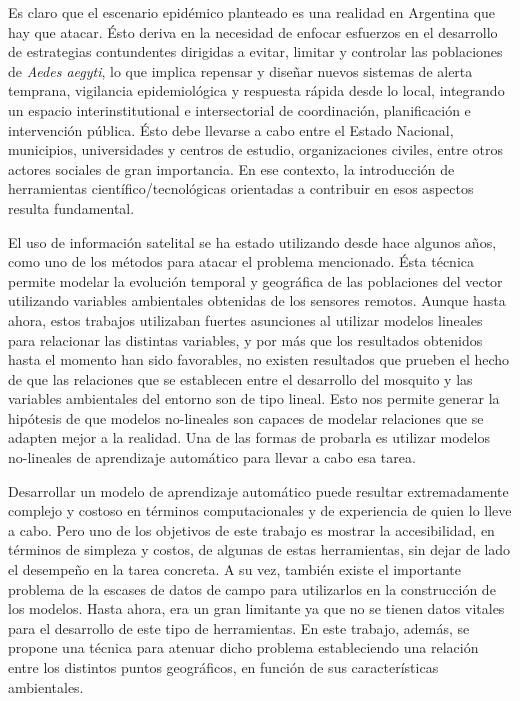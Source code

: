   \par Es claro que el escenario epidémico planteado es una realidad en Argentina
    que hay que atacar. Ésto deriva en la necesidad de enfocar esfuerzos en el
    desarrollo de estrategias contundentes dirigidas a evitar, limitar y controlar
    las poblaciones de \textit{Aedes aegyti}, lo que implica repensar y diseñar
    nuevos sistemas de alerta temprana, vigilancia epidemiológica y respuesta
    rápida desde lo local, integrando un espacio interinstitutional e
    intersectorial de coordinación, planificación e intervención pública. Ésto debe
    llevarse a cabo entre el Estado Nacional, municipios, universidades y centros
    de estudio, organizaciones civiles, entre otros actores sociales de gran importancia.
    En ese contexto, la introducción de herramientas científico/tecnológicas orientadas
    a contribuir en esos aspectos resulta fundamental.

  \par El uso de información satelital se ha estado utilizando desde hace
    algunos años, como uno de los métodos para atacar el problema mencionado.
    Ésta técnica permite modelar la evolución temporal y geográfica de las
    poblaciones del vector utilizando variables ambientales obtenidas de los
    sensores remotos. Aunque hasta ahora, estos trabajos utilizaban fuertes asunciones
    al utilizar modelos lineales para relacionar las distintas variables, y por más
    que los resultados obtenidos hasta el momento han sido
    favorables, no existen resultados que prueben el hecho de que las
    relaciones que se establecen entre el desarrollo
    del mosquito y las variables ambientales del entorno son de tipo lineal.
    Esto nos permite generar la hipótesis de que modelos no-lineales son
    capaces de modelar relaciones que se adapten mejor a la realidad.
    Una de las formas de probarla es utilizar modelos no-lineales de
    aprendizaje automático para llevar a cabo esa tarea.


  \par Desarrollar un modelo de aprendizaje automático puede resultar extremadamente
    complejo y costoso en términos computacionales y de experiencia de quien lo lleve
    a cabo. Pero uno de los objetivos de este trabajo es mostrar la accesibilidad,
    en términos de simpleza y costos, de algunas de estas herramientas, sin dejar
    de lado el desempeño en la tarea concreta. A su vez, también existe el importante problema
    de la escases de datos de campo para utilizarlos en la construcción de los modelos.
    Hasta ahora, era un gran limitante ya que no se tienen datos vitales
    para el desarrollo de este tipo de herramientas. En este trabajo, además, se
    propone una técnica para atenuar dicho problema estableciendo una relación
    entre los distintos puntos geográficos, en función de sus características ambientales.


